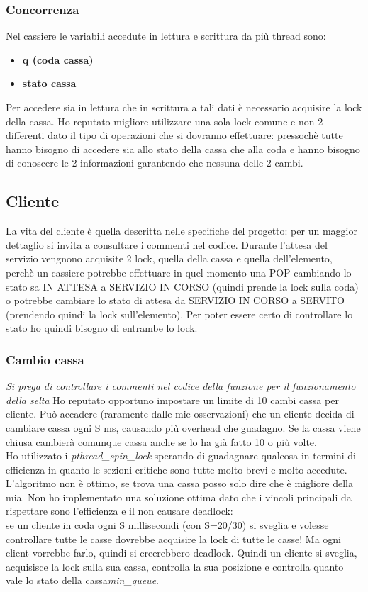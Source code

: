 \documentclass[11pt, a4paper]{article}
\begin{document}
\subsubsection{Concorrenza}
Nel cassiere le variabili accedute in lettura e scrittura da più thread sono:
\begin{itemize}
\item \textbf{q (coda cassa)}
\item \textbf{stato cassa}
\end{itemize}
Per accedere sia in lettura che in scrittura a tali dati è necessario acquisire la lock della cassa.
Ho reputato migliore utilizzare una sola lock comune e non 2 differenti dato il tipo di operazioni che si dovranno effettuare: pressochè tutte hanno bisogno di accedere sia allo stato della cassa che alla coda e hanno bisogno di conoscere le 2 informazioni garantendo che nessuna delle 2 cambi.
\subsection{Cliente}
La vita del cliente è quella descritta nelle specifiche del progetto: per un maggior dettaglio si invita a consultare i commenti nel codice.
Durante l'attesa del servizio vengnono acquisite 2 lock, quella della cassa e quella dell'elemento, perchè un cassiere potrebbe effettuare in quel momento una POP cambiando lo stato sa IN ATTESA a SERVIZIO IN CORSO (quindi prende la lock sulla coda) o potrebbe cambiare lo stato di attesa da SERVIZIO IN CORSO a SERVITO (prendendo quindi la lock sull'elemento). Per poter essere certo di controllare lo stato ho quindi bisogno di entrambe lo lock. 
\subsubsection{Cambio cassa}
\textit{Si prega di controllare i commenti nel codice della funzione per il funzionamento della selta}
Ho reputato opportuno impostare un limite di 10 cambi cassa per cliente. Può accadere (raramente dalle mie osservazioni) che un cliente decida di cambiare cassa ogni S ms, causando più overhead che guadagno. Se la cassa viene chiusa cambierà comunque cassa anche se lo ha già fatto 10 o più volte.\\
Ho utilizzato i \textit{pthread\_spin\_lock} sperando di guadagnare qualcosa in termini di efficienza in quanto le sezioni critiche sono tutte molto brevi e molto accedute.\\
L'algoritmo non è ottimo, se trova una cassa posso solo dire che è migliore della mia. Non ho implementato una soluzione ottima dato che i vincoli principali da rispettare sono l'efficienza e il non causare deadlock:\\
se un cliente in coda ogni S millisecondi (con S=20/30) si sveglia e volesse controllare tutte le casse dovrebbe acquisire la lock di tutte le casse! Ma ogni client vorrebbe farlo, quindi si creerebbero deadlock. 
Quindi un cliente si sveglia, acquisisce la lock sulla sua cassa, controlla la sua posizione e controlla quanto vale lo stato della cassa\textit{min\_queue}. 
\end{document}
